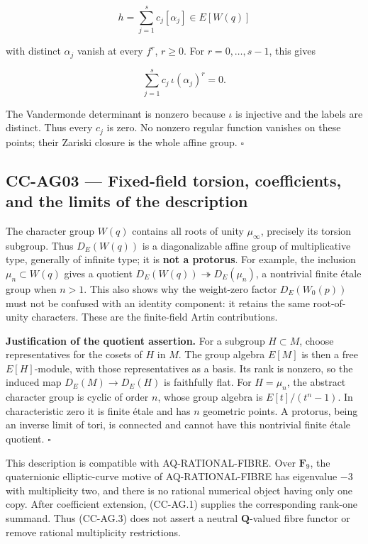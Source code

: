 \[
 h=\sum_{j=1}^s c_j[\alpha_j]\in E[W(q)]
\]

with distinct \(\alpha_j\) vanish at every \(f^r\), \(r\ge0\). For
\(r=0,\ldots,s-1\), this gives

\[
 \sum_{j=1}^s c_j\,\iota(\alpha_j)^r=0.
\]

The Vandermonde determinant is nonzero because \(\iota\) is injective
and the labels are distinct. Thus every \(c_j\) is zero. No nonzero
regular function vanishes on these points; their Zariski closure is the
whole affine group. \(\square\)

\subsection{CC-AG03 --- Fixed-field torsion, coefficients, and the
limits of the
description}\label{cc-ag03-fixed-field-torsion-coefficients-and-the-limits-of-the-description}

The character group \(W(q)\) contains all roots of unity \(\mu_\infty\),
precisely its torsion subgroup. Thus \(D_E(W(q))\) is a diagonalizable
affine group of multiplicative type, generally of infinite type; it is
\textbf{not a protorus}. For example, the inclusion
\(\mu_n\subset W(q)\) gives a quotient
\(D_E(W(q))\twoheadrightarrow D_E(\mu_n)\), a nontrivial finite étale
group when \(n>1\). This also shows why the weight-zero factor
\(D_E(W_0(p))\) must not be confused with an identity component: it
retains the same root-of-unity characters. These are the finite-field
Artin contributions.

\textbf{Justification of the quotient assertion.} For a subgroup
\(H\subset M\), choose representatives for the cosets of \(H\) in \(M\).
The group algebra \(E[M]\) is then a free \(E[H]\)-module, with those
representatives as a basis. Its rank is nonzero, so the induced map
\(D_E(M)\to D_E(H)\) is faithfully flat. For \(H=\mu_n\), the abstract
character group is cyclic of order \(n\), whose group algebra is
\(E[t]/(t^n-1)\). In characteristic zero it is finite étale and has
\(n\) geometric points. A protorus, being an inverse limit of tori, is
connected and cannot have this nontrivial finite étale quotient.
\(\square\)

This description is compatible with AQ-RATIONAL-FIBRE. Over
\(\mathbf F_9\), the quaternionic elliptic-curve motive of
AQ-RATIONAL-FIBRE has eigenvalue \(-3\) with multiplicity two, and there
is no rational numerical object having only one copy. After coefficient
extension, (CC-AG.1) supplies the corresponding rank-one summand. Thus
(CC-AG.3) does not assert a neutral \(\mathbf Q\)-valued fibre functor
or remove rational multiplicity restrictions.

